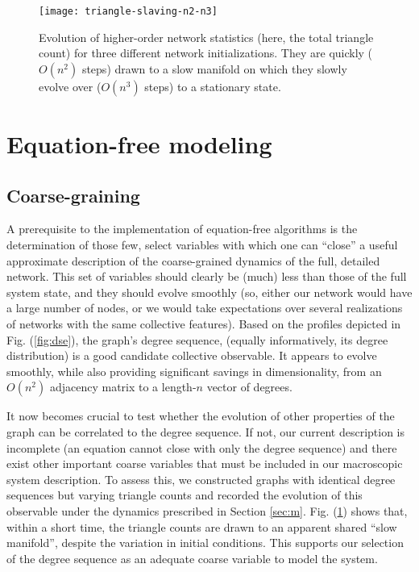   \begin{figure}
    \centering
    \texttt{[image: triangle-slaving-n2-n3]}
    \caption[Evolution of triangle count]{Evolution of higher-order
      network statistics (here, the total triangle count) for three
      different network initializations. They are quickly ($O(n^2)$
      steps) drawn to a slow manifold on which they slowly evolve over
      ($O(n^3)$ steps) to a stationary state. \label{fig:sv}}
  \end{figure}

  \section{Equation-free modeling\label{sec:ef}}

  \subsection{Coarse-graining}

  A prerequisite to the implementation of equation-free algorithms is
  the determination of those few, select variables with which one can
  ``close'' a useful approximate description of the coarse-grained
  dynamics of the full, detailed network.
  This set of variables should clearly be (much) less than those of
  the full system state, and they should evolve smoothly (so, either
  our network would have a large number of nodes, or we would take
  expectations over several realizations of networks with the same
  collective features).
  Based on the profiles depicted in Fig. (\ref{fig:dse}), the graph's
  degree sequence, (equally informatively, its degree distribution) is
  a good candidate collective observable.
  It appears to evolve smoothly, while also providing significant
  savings in dimensionality, from an $O(n^2)$ adjacency matrix to a
  length-$n$ vector of degrees. \par

  It now becomes crucial to test whether the evolution of other
  properties of the graph can be correlated to the degree sequence.
  If not, our current description is incomplete (an equation cannot
  close with only the degree sequence) and there exist other important
  coarse variables that must be included in our macroscopic system
  description.
  To assess this, we constructed graphs with identical degree
  sequences but varying triangle counts and recorded the evolution of
  this observable under the dynamics prescribed in Section
  \ref{sec:m}. Fig. (\ref{fig:sv}) shows that, within a short time,
  the triangle counts are drawn to an apparent shared ``slow
  manifold'', despite the variation in initial conditions.
  This supports our selection of the degree sequence as an adequate
  coarse variable to model the system. \par

